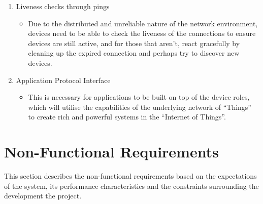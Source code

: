 \begin{enumerate}
\begin{itemize}
	\end{itemize}
	\item Liveness checks through pings
	\begin{itemize}
		\item Due to the distributed and unreliable nature of the network environment, devices need to be able to check the liveness of the connections to ensure devices are still active, and for those that aren't, react gracefully by cleaning up the expired connection and perhaps try to discover new devices.
	\end{itemize}
	\item Application Protocol Interface
	\begin{itemize}
		\item This is necessary for applications to be built on top of the device roles, which will utilise the capabilities of the underlying network of ``Things'' to create rich and powerful systems in the ``Internet of Things''.
	\end{itemize}
\end{enumerate}

\section{Non-Functional Requirements} %
\label{sec:non_functional_requirements}
This section describes the non-functional requirements based on the expectations of the system, its performance characteristics and the constraints surrounding the development the project.
